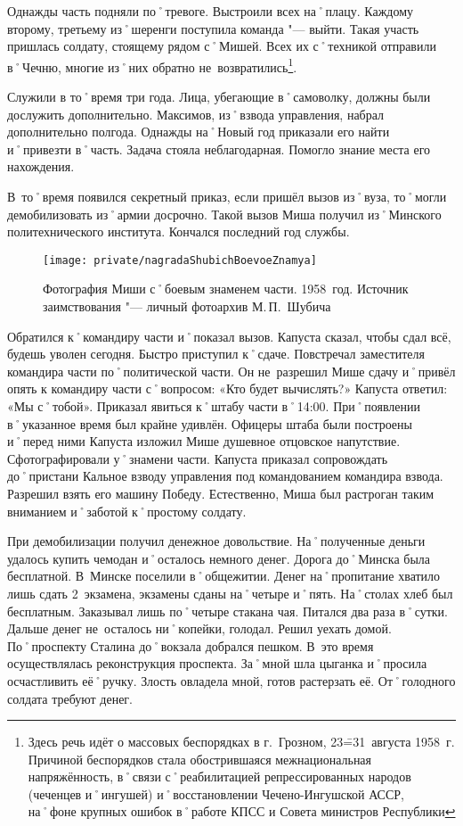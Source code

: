 Однажды часть подняли по˚тревоге. Выстроили всех на˚плацу. Каждому второму, третьему из˚шеренги поступила команда "--- выйти. Такая участь пришлась солдату, стоящему рядом с˚Мишей. Всех их с˚техникой отправили в˚Чечню, многие из˚них обратно не~возвратились\footnote
{Здесь речь идёт о массовых беспорядках в г.~Грозном, 23\==31~августа 1958~г. Причиной беспорядков стала обострившаяся межнациональная напряжённость, в˚связи с˚реабилитацией репрессированных народов (чеченцев и˚ингушей) и˚восстановлении Чечено-Ингушской АССР, на˚фоне крупных ошибок в˚работе КПСС и Совета министров Республики}. 

Служили в то˚время три года. Лица, убегающие в˚самоволку, должны были дослужить дополнительно. Максимов, из˚взвода управления, набрал дополнительно полгода. Однажды на˚Новый год приказали его найти и˚привезти в˚часть. Задача стояла неблагодарная. Помогло знание места его нахождения. 

В~то˚время появился секретный приказ, если пришёл вызов из˚вуза, то˚могли демобилизовать из˚армии досрочно. Такой вызов Миша получил из˚Минского политехнического института. Кончался последний год службы.

\begin{figure}[h]
\texttt{[image: private/nagradaShubichBoevoeZnamya]}
\caption{Фотография Миши с˚боевым знаменем части. 1958~год. Источник заимствования "--- личный фотоархив М.\,П.~Шубича}
\label{fig:nagradaShubichBoevoeZnamya}
\end{figure}

Обратился к˚командиру части и˚показал вызов. Капуста сказал, чтобы сдал всё, будешь уволен сегодня. Быстро приступил к˚сдаче. Повстречал заместителя командира части по˚политической части. Он не~разрешил Мише сдачу и˚привёл опять к командиру части с˚вопросом: «Кто будет вычислять?» Капуста ответил: «Мы с˚тобой». Приказал явиться к˚штабу части в˚14:00. При˚появлении в˚указанное время был крайне удивлён. Офицеры штаба были построены и˚перед ними Капуста изложил Мише душевное отцовское напутствие. Сфотографировали у˚знамени части. Капуста приказал сопровождать до˚пристани Кальное взводу управления под командованием командира взвода. Разрешил взять его машину Победу. Естественно, Миша был растроган таким вниманием и˚заботой к˚простому солдату. 

При демобилизации получил денежное довольствие. На˚полученные деньги удалось купить чемодан и˚осталось немного денег. Дорога до˚Минска была бесплатной. В~Минске поселили в˚общежитии. Денег на˚пропитание хватило лишь сдать 2~экзамена, экзамены сданы на˚четыре и˚пять. На˚столах хлеб был бесплатным. Заказывал лишь по˚четыре стакана чая. Питался два раза в˚сутки. Дальше денег не~осталось ни˚копейки, голодал. Решил уехать домой. По˚проспекту Сталина до˚вокзала добрался пешком. В~это время осуществлялась реконструкция проспекта. За˚мной шла цыганка и˚просила осчастливить её˚ручку. Злость овладела мной, готов растерзать её. От˚голодного солдата требуют денег.

